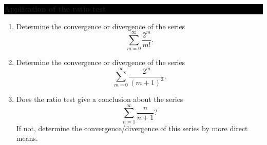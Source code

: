 \documentclass[oneside,10pt]{amsart}
\newcommand{\cbox}[1]{\colorbox{black}{\begin{minipage}{\linewidth}\color{white}\sffamily #1 \end{minipage}}}
\newcommand{\topic}[1]{\cbox{\textbf{#1}}}
\newcounter{pass}
\newif\ifshowanswers
\newcommand{\solution}[1]{\ifshowanswers{\newline\colorbox{black!20}{\begin{minipage}{\linewidth}\color{black}{#1}\end{minipage}}
}\else\fi}
\begin{document}
\topic{Application of the ratio test}
\begin{enumerate}
\setcounter{enumi}{\value{pass}}
\item
Determine the convergence or divergence of the series
$$\sum_{m=0}^\infty \frac{2^m}{m!}.$$
\solution{Writing $a_m$ for the series term the ratio of consecutive terms satisfies
\begin{align*}
\lim_{m \to \infty} \frac{a_{m+1}}{a_m} & = \lim_{m \to \infty} \left ( \frac{2^{m+1}}{(m+1)!} \frac{m!}{2^m} \right ) \\
&= \lim_{m \to \infty} \frac{2}{m+1} \\
& = 0.
\end{align*}
So by the ratio test the series $\sum a_m$ converges.
}
\item
Determine the convergence or divergence of the series
$$\sum_{m=0}^\infty \frac{2^m}{(m+1)^2}.$$
\solution{Writing $a_m$ for the series term the ratio of consecutive terms satisfies
\begin{align*}
\lim_{m \to \infty} \frac{a_{m+1}}{a_m} & = \lim_{m \to \infty} \left ( \frac{2^{m+1}}{(m+2)^2} \frac{(m+1)^2}{2^m} \right ) \\
&= \lim_{m \to \infty} 2 \left ( \frac{m+1}{m+2} \right )^2\\
& = 2\lim_{m \to \infty} \left (1 -  \frac{1}{m+2} \right )^2\\
& = 2, \text{ by the algebra of limits theorem for seqs.}
\end{align*}
So by the ratio test the series $\sum a_m$ diverges.
}
\item
Does the ratio test give a conclusion about the series
$$\sum_{n=1}^\infty \frac{n}{n+1}?$$
If not, determine the convergence/divergence of this series by more direct means.
\solution{Writing $a_n$ for the series term the ratio of consecutive terms satisfies
\begin{align*}
\lim_{n \to \infty} \frac{a_{n+1}}{a_n} & = \lim_{n \to \infty} \left ( \frac{n+1}{n+2} \frac{n+1}{n} \right ) \\
&= \lim_{n \to \infty} \frac{n^2 + 2n + 1}{n^2 + 2n}\\
&= \lim_{n \to \infty} \frac{1 + 2/n + 1/n^2}{1 + 2/n}\\
& = 1.
\end{align*}
So the ratio test is inconclusive. Looking at the series again we notice that the terms do not converge to zero, in fact
$$\lim_{n \to \infty} a_n = 1.$$
So the series does not pass the General Term Test and so the series is divergent.
}
\setcounter{pass}{\value{enumi}}
\end{enumerate}
\end{document}

